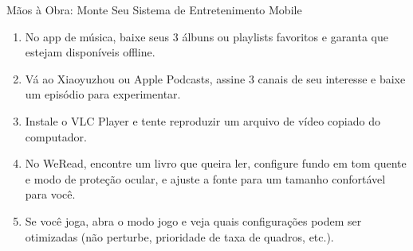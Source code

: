 \begin{tcbpractice}{Mãos à Obra: Monte Seu Sistema de Entretenimento Mobile}
\begin{enumerate}
  \item No app de música, baixe seus 3 álbuns ou playlists favoritos e garanta que estejam disponíveis offline.
  \item Vá ao Xiaoyuzhou ou Apple Podcasts, assine 3 canais de seu interesse e baixe um episódio para experimentar.
  \item Instale o VLC Player e tente reproduzir um arquivo de vídeo copiado do computador.
  \item No WeRead, encontre um livro que queira ler, configure fundo em tom quente e modo de proteção ocular, e ajuste a fonte para um tamanho confortável para você.
  \item Se você joga, abra o modo jogo e veja quais configurações podem ser otimizadas (não perturbe, prioridade de taxa de quadros, etc.).
\end{enumerate}

\end{tcbpractice}
